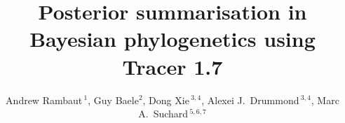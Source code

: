 \documentclass{bioinfo}
\begin{document}

\title[Tracer 1.7]{Posterior summarisation in Bayesian phylogenetics using Tracer 1.7}

\author[Rambaut \textit{et~al.}]{
Andrew Rambaut\,$^{1}$,
Guy Baele$^{2}$,
Dong Xie\,$^{3,4}$,
Alexei J.~Drummond\,$^{3,4}$,
Marc A.~Suchard\,$^{5,6,7}$
}

\address{
$^{1}$Institute of Evolutionary Biology, University of Edinburgh, Edinburgh, UK\\
$^{2}$Department of Microbiology and Immunology, Rega Institute, KU Leuven, Leuven, Belgium\\
$^{3}$Department of Computer Science, University of Auckland, Auckland, NZ\\
$^{4}$Centre for Computational Evolution, University of Auckland, Auckland, NZ\\
$^{5}$Departments of Biomathematics and Human Genetics, David Geffen School of Medicine, University of California, Los Angeles, USA \\
$^{6}$Department of Biostatistics, UCLA Fielding School of Public Health, University of California, Los Angeles, USA \\
$^{7}$Department of Human Genetics, David Geffen School of Medicine at UCLA, University of California, Los Angeles, USA\\
}



\maketitle
\end{document}
